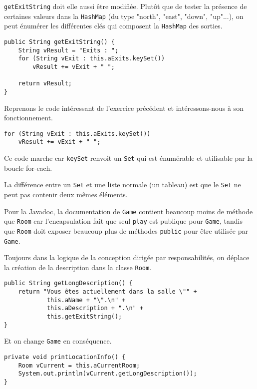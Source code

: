 \begin{exercise}[subtitle=keySet]

\verb|getExitString| doit elle aussi être modifiée. Plutôt que de tester la présence de certaines valeurs dans la \verb|HashMap| (du type "north", "east", "down", "up"...), on peut énumérer les différentes clés qui composent la \verb|HashMap| des sorties.

\begin{verbatim}
public String getExitString() {
    String vResult = "Exits : ";
    for (String vExit : this.aExits.keySet())
        vResult += vExit + " ";

    return vResult;
}
\end{verbatim}
\end{exercise}

\begin{exercise}[subtitle=Fonctionnement de keySet et Javadoc]

Reprenons le code intéressant de l'exercice précédent et intéressons-nous à son fonctionnement.

\begin{verbatim}
for (String vExit : this.aExits.keySet())
    vResult += vExit + " ";
\end{verbatim}

Ce code marche car \verb|keySet| renvoit un \verb|Set| qui est énumérable et utilisable par la boucle for-each.

La différence entre un \verb|Set| et une liste normale (un tableau) est que le \verb|Set| ne peut pas contenir deux mêmes éléments.

Pour la Javadoc, la documentation de \verb|Game| contient beaucoup moins de méthode que \verb|Room| car l'encapsulation fait que seul \verb|play| est publique pour \verb|Game|, tandis que \verb|Room| doit exposer beaucoup plus de méthodes \verb|public| pour être utilisée par \verb|Game|.

\end{exercise}

\begin{exercise}[subtitle=getLongDescription]

Toujours dans la logique de la conception dirigée par responsabilités, on déplace la création de la description dans la classe \verb|Room|.

\begin{verbatim}
public String getLongDescription() {
    return "Vous êtes actuellement dans la salle \"" +
            this.aName + "\".\n" +
            this.aDescription + ".\n" +
            this.getExitString();
}
\end{verbatim}

Et on change \verb|Game| en conséquence.

\begin{verbatim}
private void printLocationInfo() {
    Room vCurrent = this.aCurrentRoom;
    System.out.println(vCurrent.getLongDescription());
}
\end{verbatim}
\end{exercise}

